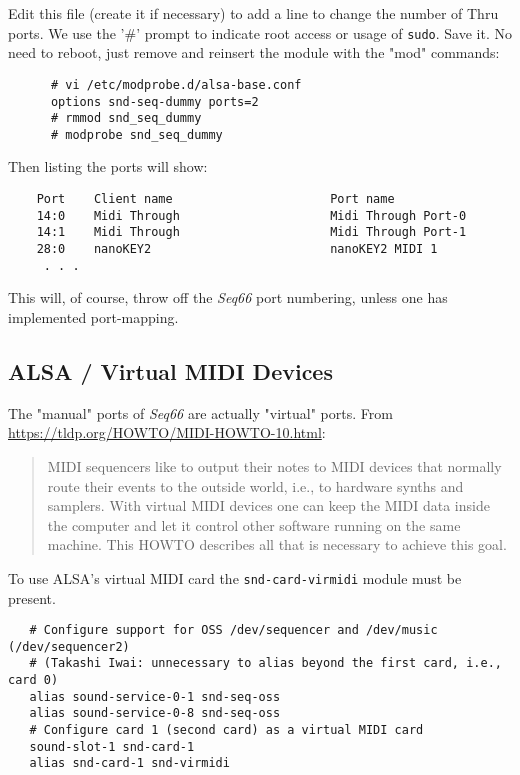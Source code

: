    Edit this file (create it if necessary) to add a line to change the number
   of Thru ports.  We use the '\#' prompt to indicate root access or usage of
   \texttt{sudo}.
   Save it.  No need to reboot, just remove and reinsert the module with the
   "mod" commands:

   \begin{verbatim}
      # vi /etc/modprobe.d/alsa-base.conf
      options snd-seq-dummy ports=2
      # rmmod snd_seq_dummy
      # modprobe snd_seq_dummy
   \end{verbatim}

   Then listing the ports will show:

   \begin{verbatim}
    Port    Client name                      Port name
    14:0    Midi Through                     Midi Through Port-0
    14:1    Midi Through                     Midi Through Port-1
    28:0    nanoKEY2                         nanoKEY2 MIDI 1
     . . .
   \end{verbatim}

   This will, of course, throw off the \textsl{Seq66} port numbering, unless
   one has implemented port-mapping.

\subsection{ALSA / Virtual MIDI Devices}
\label{subsec:alsa_virtual_midi_devices}

   The "manual" ports of \textsl{Seq66} are actually "virtual" ports.
   From \url{https://tldp.org/HOWTO/MIDI-HOWTO-10.html}:

   \begin{quote}
   MIDI sequencers like to output their notes to MIDI devices that normally
   route their events to the outside world, i.e., to hardware synths and
   samplers. With virtual MIDI devices one can keep the MIDI data inside the
   computer and let it control other software running on the same machine. This
   HOWTO describes all that is necessary to achieve this goal.
   \end{quote}

   To use ALSA's virtual MIDI card the
   \texttt{snd-card-virmidi} module must be present. 

   \begin{verbatim}
   # Configure support for OSS /dev/sequencer and /dev/music (/dev/sequencer2)
   # (Takashi Iwai: unnecessary to alias beyond the first card, i.e., card 0)
   alias sound-service-0-1 snd-seq-oss
   alias sound-service-0-8 snd-seq-oss
   # Configure card 1 (second card) as a virtual MIDI card
   sound-slot-1 snd-card-1
   alias snd-card-1 snd-virmidi
   \end{verbatim}


